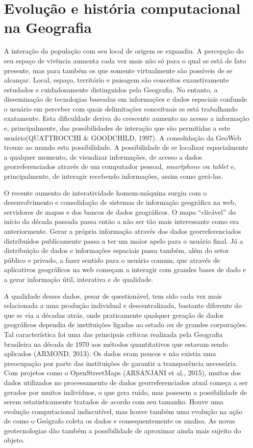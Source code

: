 \chapter{Evolução e história computacional na Geografia}
A interação da população com seu local de origem se expandiu. A percepção do seu espaço de vivência aumenta cada vez mais não só para o qual se está de fato presente, mas para também os que somente virtualmente são possíveis de se alcançar. Local, espaço, território e paisagem são conceitos exaustivamente estudados e cuidadosamente distinguidos pela Geografia. No entanto, a disseminação de tecnologias baseadas em informações e dados espaciais confunde o usuário em perceber com quais delimitações conceituais se está trabalhando exatamente. Esta dificuldade deriva do crescente aumento no acesso a informação e, principalmente, das possibilidades de interação que são permitidas a este usuário(QUATTROCCHI \& GOODCHILD, 1997)\cite{QUATTROCCHI_GOODCHILD}. A consolidação da GeoWeb trouxe ao mundo esta possibilidade. A possibilidade de se localizar espacialmente a qualquer momento, de visualizar informações, de acesso a dados georreferenciados através de um computador pessoal, \textit{smartphone} ou \textit{tablet} e, principalmente, de interagir recebendo informações, assim como gerá-las. 

O recente aumento de interatividade homem-máquina surgiu com o desenvolvimento e consolidação de sistemas de informação geográfica na web, servidores de mapas e dos bancos de dados geográficos. O mapa “clicável” do início da década passada passa então a não ser tão mais interessante como era anteriormente. Gerar a própria informação através dos dados georreferenciados distribuídos publicamente passa a ter um maior apelo para o usuário final. Já a distribuição de dados e informações espaciais passa também, além do setor público e privado, a fazer sentido para o usuário comum, que através de aplicativos geográficos na web começam a interagir com grandes bases de dado e a gerar informação útil, interativa e de qualidade. 

A qualidade desses dados, pesar de questionável, tem sido cada vez mais relacionada a uma produção individual e descentralizada, bastante diferente do que se via a décadas atrás, onde praticamente qualquer geração de dados geográficos dependia de instituições ligadas ao estado ou de grandes corporações. Tal característica foi uma das principais críticas realizada pela Geografia brasileira na década de 1970 aos métodos quantitativos que estavam sendo aplicados (ARMOND, 2013)\cite{ARMOND}. Os dados eram poucos e não existia uma preocupação por parte das instituições de garantir a transparência necessária. Com projetos como o OpenStreetMaps (ARSANJANI et al., 2015)\cite{ARSANJANI_etal15}, muitos dos dados utilizados no processamento de dados georreferenciados atual começa a ser gerados por muitos indivíduos, o que gera ruído, mas possuem a possibilidade de serem estatisticamente tratados de acordo com seu tamanho. Houve uma evolução computacional indiscutível, mas houve também uma evolução na ação de como o Geógrafo coleta os dados e consequentemente os analisa. As novas geotecnologias dão também a possibilidade de aproximar ainda mais sujeito do objeto. 

